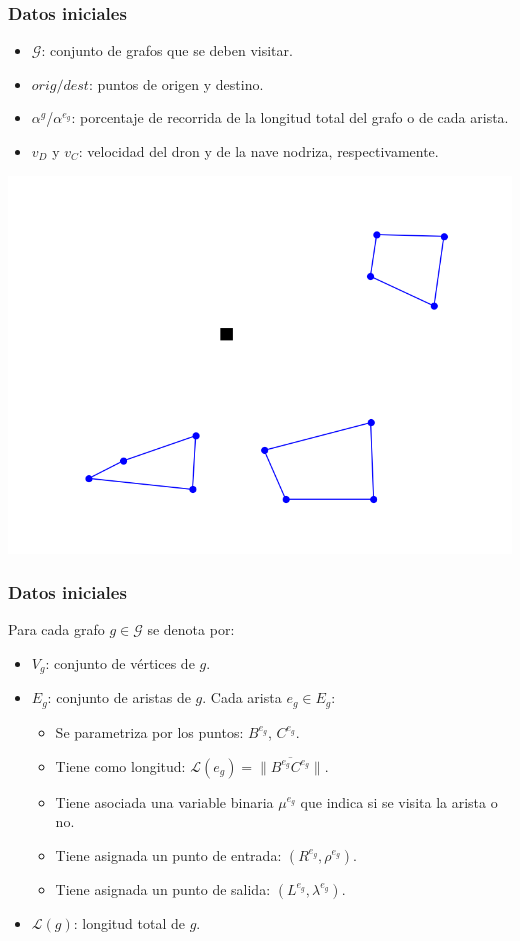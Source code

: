 \documentclass[slidestop,usepdftitle=false, xcolor=table]{beamer}
\begin{document}
	\begin{frame}
		\frametitle{Datos iniciales}
		\begin{itemize}
		\item $\mathcal G$: conjunto de grafos que se deben visitar.
		\item $orig/dest$: puntos de origen y destino.
		\item $\alpha^g$/$\alpha^{e_g}$: porcentaje de recorrida de la longitud total del grafo o de cada arista.
		\item $v_D$ y $v_C$: velocidad del dron y de la nave nodriza, respectivamente.
		\end{itemize}
		\begin{center}
			\includegraphics[width=0.5\linewidth]{PDMTZ_1}
		\end{center}
	\end{frame}

	\begin{frame}
		\frametitle{Datos iniciales}
		Para cada grafo $g\in\mathcal G$ se denota por:
		\begin{itemize}
			\item $V_g$: conjunto de vértices de $g$.
			\item $E_g$: conjunto de aristas de $g$. Cada arista $e_g\in E_g$:
			\begin{itemize}
				\item Se parametriza por los puntos: $B^{e_g}$, $C^{e_g}$.
				\item Tiene como longitud: $\mathcal L(e_g)=\|\overline{B^{e_g}C^{e_g}}\|$.
				\item Tiene asociada una variable binaria $\mu^{e_g}$ que indica si se visita la arista o no.
				\item Tiene asignada un punto de entrada: $(R^{e_g}, \rho^{e_g})$.
				\item Tiene asignada un punto de salida: $(L^{e_g}, \lambda^{e_g})$.
			\end{itemize}
				
			\item $\mathcal L(g)$: longitud total de $g$.
		\end{itemize}
	\end{frame}
	
\end{document}
